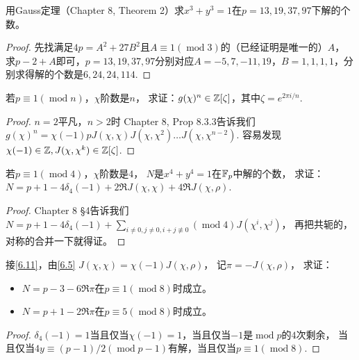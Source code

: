 \begin{exercise}\label{6.9}
 用Gauss定理（Chapter 8, Theorem 2）求$x^3+y^3=1$在$p=13,19,37,97$下解的个数。
\end{exercise}
\begin{proof}
    先找满足$4p=A^2+27B^2$且$A\equiv1(\operatorname{mod}3)$的（已经证明是唯一的）$A$，
    求$p-2+A$即可，$p=13,19,37,97$分别对应$A=-5,7,-11,19$，$B=1,1,1,1$，分别求得解的个数是$6,24,24,114$.
\end{proof}

\begin{exercise}\label{6.10}
    若$p\equiv1(\operatorname{mod}n)$，$\chi$阶数是$n$，
    求证：$g(\chi)^n\in\mathbb{Z}[\zeta]$，其中$\zeta=e^{2\pi i/n}$.
\end{exercise}
\begin{proof}
    $n=2$平凡，$n>2$时
    Chapter 8, Prop 8.3.3告诉我们$g(\chi)^n=\chi(-1)pJ(\chi,\chi)J(\chi,\chi^2)\ldots J(\chi,\chi^{n-2})$.
    容易发现$\chi(-1)\in\mathbb{Z},J(\chi,\chi^k)\in\mathbb{Z}[\zeta]$.
\end{proof}

\begin{exercise}\label{6.11}
    若$p\equiv1(\operatorname{mod}4)$，$\chi$阶数是$4$，
    $N$是$x^4+y^4=1$在$\mathbb{F}_p$中解的个数，
    求证：$N=p+1-4\delta_4(-1)+2\Re J(\chi,\chi)+4\Re J(\chi,\rho)$.
\end{exercise}
\begin{proof}
    Chapter 8 \S 4告诉我们$N=p+1-4\delta_4(-1)+\sum_{i\neq0,j\neq0,i+j\not\equiv0}(\operatorname{mod}4)J(\chi^i,\chi^j)$，
    再把共轭的，对称的合并一下就得证。
\end{proof}

\begin{exercise}\label{6.12}
    接\ref{6.11}，由\ref{6.5} $J(\chi,\chi)=\chi(-1)J(\chi,\rho)$，
    记$\pi=-J(\chi,\rho)$，
    求证：
    \begin{itemize}
        \item[(1)] $N=p-3-6\Re\pi$在$p\equiv1(\operatorname{mod}8)$时成立。
        \item[(2)] $N=p+1-2\Re\pi$在$p\equiv5(\operatorname{mod}8)$时成立。
    \end{itemize}
\end{exercise}
\begin{proof}
    $\delta_4(-1)=1$当且仅当$\chi(-1)=1$，当且仅当$-1$是$\operatorname{mod}p$的$4$次剩余，
    当且仅当$4y\equiv(p-1)/2(\operatorname{mod}p-1)$有解，当且仅当$p\equiv1(\operatorname{mod}8)$.
\end{proof}

